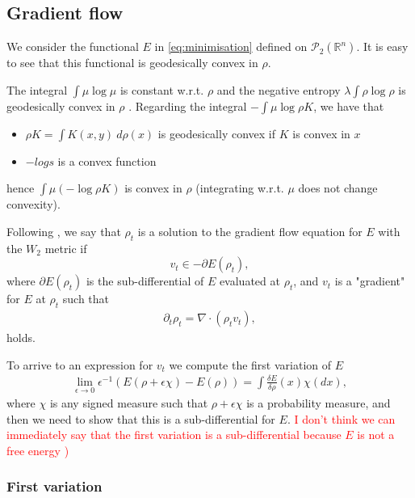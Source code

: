 \documentclass[a4paper]{article}
\def\real{\mathbb{R}}
\begin{document}
\subsection{Gradient flow} 

We consider the functional $E$ in \eqref{eq:minimisation} defined on $\mathcal{P}_2(\real^n)$.
It is easy to see that this functional is geodesically convex in $\rho$.

The integral $\int\mu\log\mu$ is constant w.r.t. $\rho$ and the negative entropy $\lambda\int\rho\log\rho$ is geodesically convex in $\rho$ \citep[page 130]{santambrogio2017euclidean}.
Regarding the integral $- \int\mu\log\rho K$, we have that
\begin{itemize}
\item $\rho K = \int K(x, y) \ d\rho(x)$ is geodesically convex if $K$ is convex in $x$ \citep[page 128]{santambrogio2017euclidean}
\item $-log s$ is a convex function
\end{itemize}
hence $\int\mu\left( -\log\rho K\right)$ is convex in $\rho$ (integrating w.r.t. $\mu$ does not change convexity).


Following \citet[Definition 11.1.1]{ambrosio2008gradient}, we say that $\rho_t$ is a solution to the gradient flow equation for $E$ with the $W_2$ metric if
\begin{equation*}
v_t \in -\partial E(\rho_t),
\end{equation*}
where $\partial E(\rho_t)$ is the sub-differential of $E$ evaluated at $\rho_t$, and $v_t$ is a "gradient" for $E$ at $\rho_t$ such that
\begin{align*}
\partial_{t}\rho_{t}=\nabla\cdot\left(\rho_{t}v_t\right),
\end{align*} 
holds.

To arrive to an expression for $v_t$ we compute the first variation of $E$
\begin{align*}
\lim_{\epsilon\rightarrow0}\epsilon^{-1}\left(E(\rho+\epsilon\chi)-E(\rho)\right)=\int\frac{\delta E}{\delta\rho}\left(x\right)\chi\left(dx\right),
\end{align*}
where $\chi$ is any signed measure such that $\rho+\epsilon\chi$ is a probability measure, and then we need to show that this is a sub-differential for $E$.
\textcolor{red}{I don't think we can immediately say that the first variation is a sub-differential because $E$ is not a free energy \citep[Lemma 8-10]{carrillo2006contractions})}

\subsubsection{First variation}
\end{document}
